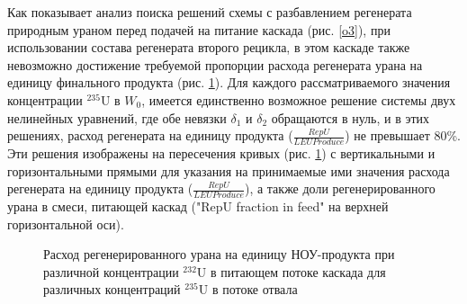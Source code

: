 Как показывает анализ поиска решений схемы с разбавлением регенерата природным ураном перед подачей на питание каскада (рис. \ref{o3}), при использовании состава регенерата второго рецикла, в этом каскаде также невозможно достижение требуемой пропорции расхода регенерата урана на единицу финального продукта (рис. \ref{sc3_1.second}). Для каждого рассматриваемого значения концентрации $^{235}$U в $W_0$, имеется единственно возможное решение системы двух нелинейных уравнений, где обе невязки $\delta_1$ и $\delta_2$  обращаются в нуль, и в этих решениях, расход регенерата на единицу продукта ($\frac{RepU}{LEU Produce}$) не превышает 80\%. Эти решения изображены на пересечения кривых (рис. \ref{sc3_1.second}) с вертикальными и горизонтальными прямыми для указания на принимаемые ими значения расхода регенерата на единицу продукта ($\frac{RepU}{LEU Produce}$), а также доли регенерированного урана в смеси, питающей каскад ("RepU fraction in feed" на верхней горизонтальной оси).


\begin{figure}[ht]
  \caption{Расход регенерированного урана на единицу НОУ-продукта  при различной концентрации $^{232}$U в питающем потоке каскада для различных концентраций $^{235}$U в потоке отвала}\label{sc3_1.second}
\end{figure}




